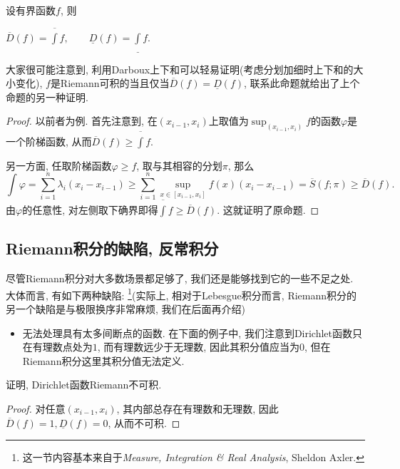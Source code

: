\begin{proposition}{}
	设有界函数$f$, 则
	\begin{center}
		$\displaystyle \overline{D}(f) = \overline{\int}f,\qquad \underline{D}(f) = \underline{\int}f.$
	\end{center}
\end{proposition}
\begin{remark}
	大家很可能注意到, 利用Darboux上下和可以轻易证明(考虑分划加细时上下和的大小变化), $f$是Riemann可积的当且仅当$\overline{D}(f)=\underline{D}(f)$, 联系此命题就给出了上个命题的另一种证明. 
\end{remark}
\begin{proof}
	以前者为例. 首先注意到, 在$(x_{i-1},x_i)$上取值为$\sup_{(x_{i-1},x_i)}f$的函数$\varphi$是一个阶梯函数, 从而$\overline{D}(f) \geq \overline{\int}f$. 
	
	另一方面, 任取阶梯函数$\varphi \geq f$, 取与其相容的分划$\pi$, 那么$$\int \varphi = \sum_{i=1}^{n} \lambda _i (x_i-x_{i-1}) \geq \sum_{i=1}^{n} \sup_{x\in[x_{i-1},x_i]}f(x) (x_i-x_{i-1}) = \overline{S}(f;\pi) \geq \overline{D}(f).$$
	 由$\varphi$的任意性, 对左侧取下确界即得$\overline{\int}f \geq \overline{D}(f)$. 这就证明了原命题. 
\end{proof}

\subsection{Riemann积分的缺陷, 反常积分}

尽管Riemann积分对大多数场景都足够了, 我们还是能够找到它的一些不足之处. 大体而言, 有如下两种缺陷: \footnote{这一节内容基本来自于\textit{Measure, Integration \& Real Analysis}, Sheldon Axler.}(实际上, 相对于Lebesgue积分而言, Riemann积分的另一个缺陷是与极限换序非常麻烦, 我们在后面再介绍)

\begin{itemize}
	\item 无法处理具有太多间断点的函数. 在下面的例子中, 我们注意到Dirichlet函数只在有理数点处为$1$, 而有理数远少于无理数, 因此其积分值应当为$0$, 但在Riemann积分这里其积分值无法定义. 
\end{itemize}

\begin{example}
	证明, Dirichlet函数Riemann不可积. 
\end{example}
\begin{proof}
	对任意$(x_{i-1},x_i)$, 其内部总存在有理数和无理数, 因此$\overline{D}(f)=1,\underline{D}(f)=0$, 从而不可积. 
\end{proof}

